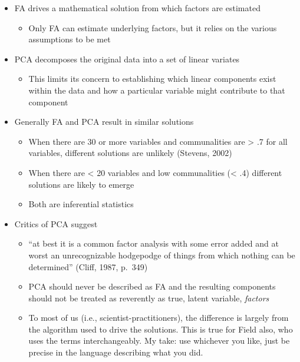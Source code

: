 \documentclass[
  english,
]{book}
\providecommand{\tightlist}{%
  \setlength{\itemsep}{0pt}\setlength{\parskip}{0pt}}
\begin{document}
\begin{itemize}
\tightlist
\item
  FA drives a mathematical solution from which factors are estimated

  \begin{itemize}
  \tightlist
  \item
    Only FA can estimate underlying factors, but it relies on the various assumptions to be met
  \end{itemize}
\item
  PCA decomposes the original data into a set of linear variates

  \begin{itemize}
  \tightlist
  \item
    This limits its concern to establishing which linear components exist within the data and how a particular variable might contribute to that component
  \end{itemize}
\item
  Generally FA and PCA result in similar solutions

  \begin{itemize}
  \tightlist
  \item
    When there are 30 or more variables and communalities are \textgreater{} .7 for all variables, different solutions are unlikely (Stevens, 2002)
  \item
    When there are \textless{} 20 variables and low communalities (\textless{} .4) different solutions are likely to emerge
  \item
    Both are inferential statistics
  \end{itemize}
\item
  Critics of PCA suggest

  \begin{itemize}
  \tightlist
  \item
    ``at best it is a common factor analysis with some error added and at worst an unrecognizable hodgepodge of things from which nothing can be determined'' (Cliff, 1987, p.~349)
  \item
    PCA should never be described as FA and the resulting components should not be treated as reverently as true, latent variable, \emph{factors}
  \item
    To most of us (i.e., scientist-practitioners), the difference is largely from the algorithm used to drive the solutions. This is true for Field \citep{field_discovering_2012} also, who uses the terms interchangeably. My take: use whichever you like, just be precise in the language describing what you did.
  \end{itemize}
\end{itemize}
\end{document}
